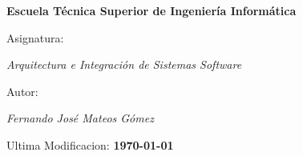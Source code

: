 \begin{titlepage}
        \centering
        {\bfseries\LARGE Escuela Técnica Superior de Ingeniería Informática \par}
        \vspace{1cm}
        {\Large Asignatura: \par \textit{Arquitectura e Integración de Sistemas Software} \par}
        \vspace{1cm}
        {\Large Autor: \par \textit{Fernando José Mateos Gómez} \par}
        \vspace{2cm}
        {\Large Ultima Modificacion: \textbf{\today} \par}
        \vspace{2cm}
\end{titlepage}
\restoregeometry